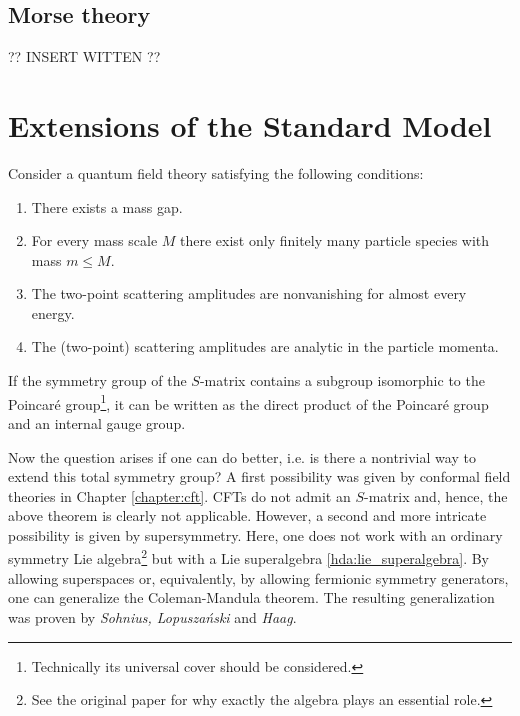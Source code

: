 \subsection{Morse theory}

    ?? INSERT WITTEN ??

\section{Extensions of the Standard Model}

    \begin{theorem}
        Consider a quantum field theory satisfying the following conditions:
        \begin{enumerate}
            \item There exists a mass gap.
            \item For every mass scale $M$ there exist only finitely many particle species with mass $m\leq M$.
            \item The two-point scattering amplitudes are nonvanishing for almost every energy.
            \item The (two-point) scattering amplitudes are analytic in the particle momenta.
        \end{enumerate}
        If the symmetry group of the $S$-matrix contains a subgroup isomorphic to the Poincar\'e group\footnote{Technically its universal cover should be considered.}, it can be written as the direct product of the Poincar\'e group and an internal gauge group.
    \end{theorem}

    Now the question arises if one can do better, i.e. is there a nontrivial way to extend this total symmetry group? A first possibility was given by conformal field theories in Chapter \ref{chapter:cft}. CFTs do not admit an $S$-matrix and, hence, the above theorem is clearly not applicable. However, a second and more intricate possibility is given by supersymmetry. Here, one does not work with an ordinary symmetry Lie algebra\footnote{See the original paper \cite{coleman_mandula} for why exactly the algebra plays an essential role.} but with a Lie superalgebra \ref{hda:lie_superalgebra}. By allowing superspaces or, equivalently, by allowing fermionic symmetry generators, one can generalize the Coleman-Mandula theorem. The resulting generalization was proven by \textit{Sohnius, Lopusza\'nski} and \textit{Haag}.